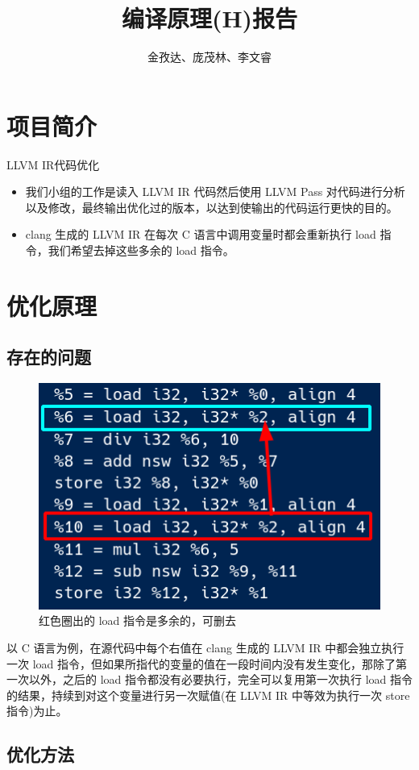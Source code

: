 \documentclass{ctexart}
\begin{document}
    \title{编译原理(H)报告}
    \author{金孜达、庞茂林、李文睿}
    \maketitle
    \section{项目简介}
    LLVM IR代码优化
    \begin{itemize}
        \item 我们小组的工作是读入 LLVM IR 代码然后使用 LLVM Pass 对代码进行分析以及修改，最终输出优化过的版本，以达到使输出的代码运行更快的目的。
        \item clang 生成的 LLVM IR 在每次 C 语言中调用变量时都会重新执行 load 指令，我们希望去掉这些多余的 load 指令。
    \end{itemize}
    \section{优化原理}
    \subsection{存在的问题}
    \begin{figure}
        \includegraphics[width=.5\textwidth]{dup_load.png}
        \caption{红色圈出的 load 指令是多余的，可删去}
    \end{figure}
    以 C 语言为例，在源代码中每个右值在 clang 生成的 LLVM IR 中都会独立执行一次 load 指令，但如果所指代的变量的值在一段时间内没有发生变化，那除了第一次以外，之后的 load 指令都没有必要执行，完全可以复用第一次执行 load 指令的结果，持续到对这个变量进行另一次赋值(在 LLVM IR 中等效为执行一次 store 指令)为止。
    \subsection{优化方法}
\end{document}

